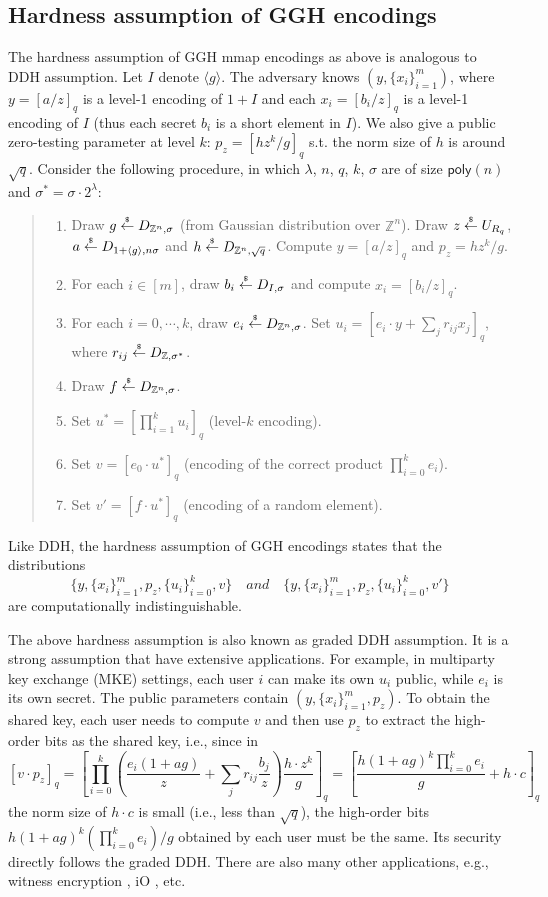 \documentclass[10pt]{article}
\newcommand{\rsample}{\stackrel{\mbox{\tiny $\$$}}{\leftarrow}}
\theoremstyle{plain}
\theoremstyle{definition}
\theoremstyle{remark}
\newcommand{\getsr}{\rsample}
\newcommand{\angles}[1]{\langle #1 \rangle}
\newcommand{\Z}{\mathbb{Z}}
\begin{document}
\subsection{Hardness assumption of GGH encodings}
The hardness assumption of GGH mmap encodings as above is analogous to DDH assumption. Let $I$ denote $\angles{g}$. The adversary knows $(y, \{x_i\}_{i=1}^m)$, where $y = [a/z]_q$ is a level-1 encoding of $1+I$ and each $x_i = [b_i/z]_q$ is a level-1 encoding of $I$ (thus each secret $b_i$ is a short element in $I$). We also give a public zero-testing parameter at level $k$: $p_z = [hz^k/g]_q$ s.t. the norm size of $h$ is around $\sqrt{q}$. Consider the following procedure, in which $\lambda$, $n$, $q$, $k$, $\sigma$ are of size $\mathsf{poly}(n)$ and $\sigma^*=\sigma\cdot 2^\lambda$:
\begin{quote}
\begin{enumerate}
\item Draw $g \getsr D_{\Z^n, \sigma}$ (from Gaussian distribution over $\Z^n$). Draw $z \getsr U_{R_q}$, $a \getsr D_{1+\angles{g},n\sigma}$ and $h \getsr D_{\Z^n, \sqrt{q}}$. Compute $y = [a/z]_q$ and $p_z = hz^k/g$.
\item For each $i\in [m]$, draw $b_i \getsr D_{I,\sigma}$ and compute $x_i = [b_i/z]_q$.
\item For each $i=0,\cdots, k$, draw $e_i \getsr D_{\Z^n,\sigma}$. Set $u_i = [e_i\cdot y + \sum_j r_{ij}x_j]_q$, where $r_{ij} \getsr D_{\Z, \sigma^*}$.
\item Draw $f \getsr D_{\Z^n,\sigma}$.
\item Set $u^* = [\prod_{i=1}^k u_i]_q$ (level-$k$ encoding).
\item Set $v = [e_0 \cdot u^*]_q$ (encoding of the correct product $\prod_{i=0}^k e_i$).
\item Set $v' = [f \cdot u^*]_q$ (encoding of a random element).
\end{enumerate}
\end{quote}
Like DDH, the hardness assumption of GGH encodings states that the distributions
$$\{y, \{x_i\}_{i=1}^m, p_z, \{u_i\}_{i=0}^k, v\}\quad and \quad \{y, \{x_i\}_{i=1}^m, p_z, \{u_i\}_{i=0}^k, v'\}$$
are computationally indistinguishable.

The above hardness assumption is also known as graded DDH assumption. It is a strong assumption that have extensive applications. For example, in multiparty key exchange (MKE) settings, each user $i$ can make its own $u_i$ public, while $e_i$ is its own secret. The public parameters contain $(y, \{x_i\}_{i=1}^m, p_z)$. To obtain the shared key, each user needs to compute $v$ and then use $p_z$ to extract the high-order bits as the shared key, i.e., since in
$$[v\cdot p_z]_q = [\prod_{i=0}^k(\frac{e_i(1+ag)}{z}+\sum_j r_{ij}\frac{b_j}{z})\frac{h\cdot z^k}{g}]_q=[\frac{h(1+ag)^k\prod_{i=0}^k e_i}{g} + h\cdot c]_q$$
the norm size of $h\cdot c$ is small (i.e., less than $\sqrt{q}$), the high-order bits $h(1+ag)^k(\prod_{i=0}^k e_i)/g$ obtained by each user must be the same. Its security directly follows the graded DDH. There are also many other applications, e.g., witness encryption \cite{GGSW13}, iO \cite{GGH13b}, etc.
\end{document}
